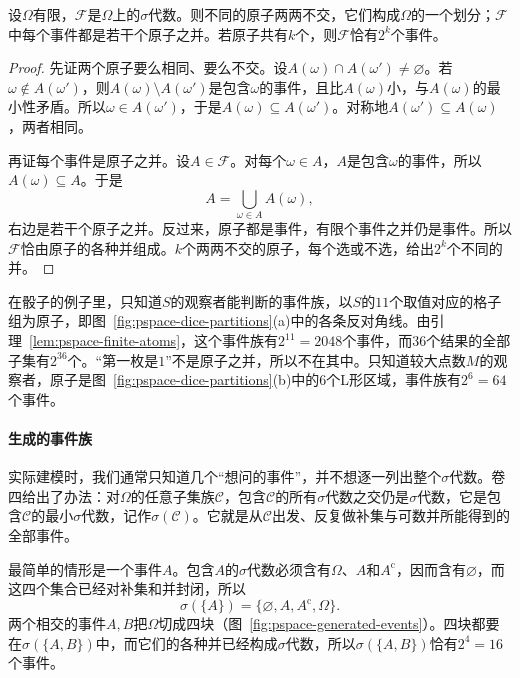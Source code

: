 \begin{lemma}
\label{lem:pspace-finite-atoms}
设$\Omega$有限，$\mathcal{F}$是$\Omega$上的$\sigma$代数。则不同的原子两两不交，它们构成$\Omega$的一个划分；$\mathcal{F}$中每个事件都是若干个原子之并。若原子共有$k$个，则$\mathcal{F}$恰有$2^{k}$个事件。
\end{lemma}

\begin{proof}
先证两个原子要么相同、要么不交。设$A(\omega)\cap A(\omega')\neq\varnothing$。若$\omega\notin A(\omega')$，则$A(\omega)\setminus A(\omega')$是包含$\omega$的事件，且比$A(\omega)$小，与$A(\omega)$的最小性矛盾。所以$\omega\in A(\omega')$，于是$A(\omega)\subseteq A(\omega')$。对称地$A(\omega')\subseteq A(\omega)$，两者相同。

再证每个事件是原子之并。设$A\in\mathcal{F}$。对每个$\omega\in A$，$A$是包含$\omega$的事件，所以$A(\omega)\subseteq A$。于是
\[
  A=\bigcup_{\omega\in A}A(\omega),
\]
右边是若干个原子之并。反过来，原子都是事件，有限个事件之并仍是事件。所以$\mathcal{F}$恰由原子的各种并组成。$k$个两两不交的原子，每个选或不选，给出$2^{k}$个不同的并。
\end{proof}

在骰子的例子里，只知道$S$的观察者能判断的事件族，以$S$的$11$个取值对应的格子组为原子，即图~\ref{fig:pspace-dice-partitions}(a)中的各条反对角线。由引理~\ref{lem:pspace-finite-atoms}，这个事件族有$2^{11}=2048$个事件，而$36$个结果的全部子集有$2^{36}$个。“第一枚是$1$”不是原子之并，所以不在其中。只知道较大点数$M$的观察者，原子是图~\ref{fig:pspace-dice-partitions}(b)中的$6$个L形区域，事件族有$2^{6}=64$个事件。

\paragraph{生成的事件族}
实际建模时，我们通常只知道几个“想问的事件”，并不想逐一列出整个$\sigma$代数。卷四给出了办法：对$\Omega$的任意子集族$\mathcal{C}$，包含$\mathcal{C}$的所有$\sigma$代数之交仍是$\sigma$代数，它是包含$\mathcal{C}$的最小$\sigma$代数，记作$\sigma(\mathcal{C})$。它就是从$\mathcal{C}$出发、反复做补集与可数并所能得到的全部事件。

最简单的情形是一个事件$A$。包含$A$的$\sigma$代数必须含有$\Omega$、$A$和$A^{\mathrm{c}}$，因而含有$\varnothing$，而这四个集合已经对补集和并封闭，所以
\[
  \sigma(\{A\})=\{\varnothing,A,A^{\mathrm{c}},\Omega\}.
\]
两个相交的事件$A,B$把$\Omega$切成四块（图~\ref{fig:pspace-generated-events}）。四块都要在$\sigma(\{A,B\})$中，而它们的各种并已经构成$\sigma$代数，所以$\sigma(\{A,B\})$恰有$2^{4}=16$个事件。

